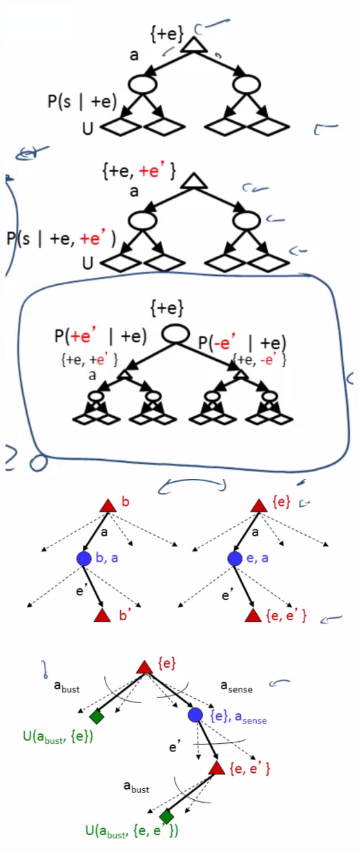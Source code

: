 \documentclass[twocolumn]{article}
\begin{document}
{\includegraphics[scale=0.7]{snapshot139}\\
\includegraphics[scale=0.4]{snapshot140}\\
}
\end{document}
